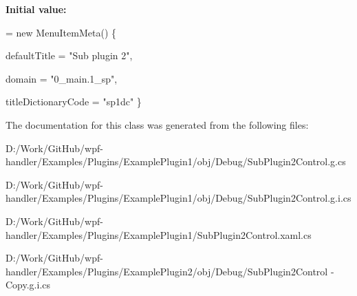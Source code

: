 {\bfseries Initial value\+:}
\begin{DoxyCode}
= \textcolor{keyword}{new} MenuItemMeta()
        \{
            
            defaultTitle = \textcolor{stringliteral}{"Sub plugin 2"},

            
            domain = \textcolor{stringliteral}{"0\_main.1\_sp"},

            
            titleDictionaryCode = \textcolor{stringliteral}{"sp1dc"}
        \}
\end{DoxyCode}


The documentation for this class was generated from the following files\+:\begin{DoxyCompactItemize}
\item 
D\+:/\+Work/\+Git\+Hub/wpf-\/handler/\+Examples/\+Plugins/\+Example\+Plugin1/obj/\+Debug/Sub\+Plugin2\+Control.\+g.\+cs\item 
D\+:/\+Work/\+Git\+Hub/wpf-\/handler/\+Examples/\+Plugins/\+Example\+Plugin1/obj/\+Debug/Sub\+Plugin2\+Control.\+g.\+i.\+cs\item 
D\+:/\+Work/\+Git\+Hub/wpf-\/handler/\+Examples/\+Plugins/\+Example\+Plugin1/Sub\+Plugin2\+Control.\+xaml.\+cs\item 
D\+:/\+Work/\+Git\+Hub/wpf-\/handler/\+Examples/\+Plugins/\+Example\+Plugin2/obj/\+Debug/Sub\+Plugin2\+Control -\/ Copy.\+g.\+i.\+cs\end{DoxyCompactItemize}
